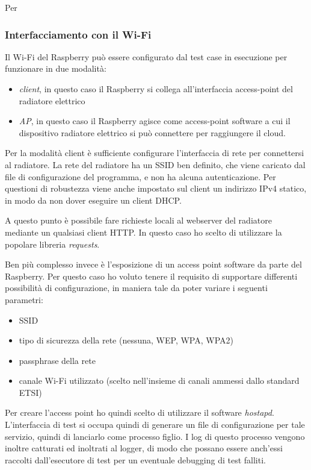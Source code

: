 \documentclass[a4paper,titlepage]{article}
\begin{document}
Per

\subsubsection{Interfacciamento con il Wi-Fi}

Il Wi-Fi del Raspberry può essere configurato dal test case in esecuzione per
funzionare in due modalità:

\begin{itemize}
    \item \textit{client}, in questo caso il Raspberry si collega all'interfaccia
        access-point del radiatore elettrico
    \item \textit{AP}, in questo caso il Raspberry agisce come access-point software
        a cui il dispositivo radiatore elettrico si può connettere per raggiungere il
        cloud.
\end{itemize}

Per la modalità client è sufficiente configurare l'interfaccia di rete per connettersi
al radiatore. La rete del radiatore ha un SSID ben definito, che viene caricato dal
file di configurazione del programma, e non ha alcuna autenticazione. Per questioni
di robustezza viene anche impostato sul client un indirizzo IPv4 statico, in modo da
non dover eseguire un client DHCP.

A questo punto è possibile fare richieste locali al webserver del radiatore mediante
un qualsiasi client HTTP. In questo caso ho scelto di utilizzare la popolare
libreria \textit{requests}.

Ben più complesso invece è l'esposizione di un access point software da parte del
Raspberry. Per questo caso ho voluto tenere il requisito di supportare differenti
possibilità di configurazione, in maniera tale da poter variare i seguenti parametri:
\begin{itemize}
    \item SSID
    \item tipo di sicurezza della rete (nessuna, WEP, WPA, WPA2)
    \item passphrase della rete
    \item canale Wi-Fi utilizzato (scelto nell'insieme di canali ammessi dallo standard ETSI)
\end{itemize}

Per creare l'access point ho quindi scelto di utilizzare il software \textit{hostapd}.
L'interfaccia di test si occupa quindi di generare un file di configurazione per tale
servizio, quindi di lanciarlo come processo figlio. I log di questo processo vengono
inoltre catturati ed inoltrati al logger, di modo che possano essere anch'essi raccolti
dall'esecutore di test per un eventuale debugging di test falliti.
\end{document}
